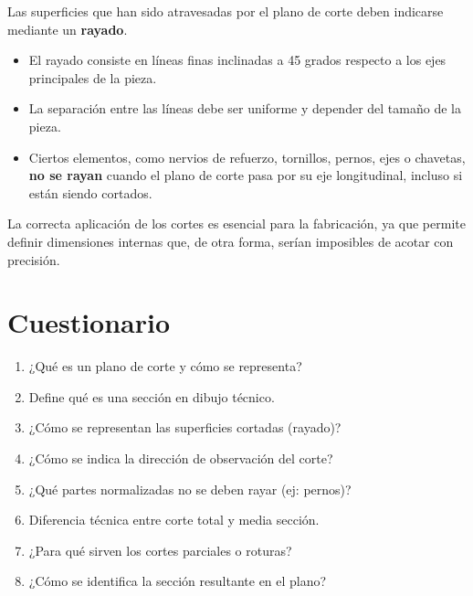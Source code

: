 Las superficies que han sido atravesadas por el plano de corte deben
indicarse mediante un \textbf{rayado}.
\begin{itemize}
	\item El rayado consiste en líneas finas inclinadas a 45 grados
	      respecto a los ejes principales de la pieza.
	\item La separación entre las líneas debe ser uniforme y depender
	      del tamaño de la pieza.
	\item Ciertos elementos, como nervios de refuerzo, tornillos,
	      pernos, ejes o chavetas, \textbf{no se rayan} cuando el
	      plano de corte pasa por su eje longitudinal, incluso si
	      están siendo cortados.
\end{itemize}

La correcta aplicación de los cortes es esencial para la fabricación,
ya que permite definir dimensiones internas que, de otra forma, serían
imposibles de acotar con precisión.

\section{Cuestionario}
\begin{enumerate}
	\item ¿Qué es un plano de corte y cómo se representa?
	\item Define qué es una sección en dibujo técnico.
	\item ¿Cómo se representan las superficies cortadas (rayado)?
	\item ¿Cómo se indica la dirección de observación del corte?
	\item ¿Qué partes normalizadas no se deben rayar (ej: pernos)?
	\item Diferencia técnica entre corte total y media sección.
	\item ¿Para qué sirven los cortes parciales o roturas?
	\item ¿Cómo se identifica la sección resultante en el plano?
\end{enumerate}

